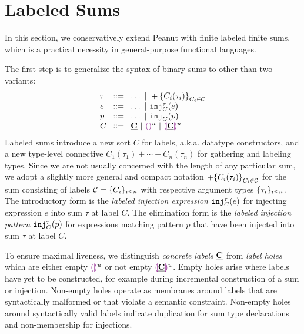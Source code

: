 \section{Labeled Sums}\label{sec:labeledsums}

In this section, we conservatively extend Peanut with finite labeled finite sums, which is a practical necessity in general-purpose functional languages.

The first step is to generalize the syntax of binary sums to other than two variants:
\[
  \arraycolsep=4pt\begin{array}{lll}
    \tau & ::= & \ldots ~\vert~ \tlabeledsum{C_i(\tau_i)}_{C_i \in \tagset} \\
    e    & ::= & \ldots ~\vert~ \hinj{C}{\tau}{e}                           \\
    p    & ::= & \ldots ~\vert~ \hinjp{C}{p}                                \\
    C    & ::= & \tagC ~\vert~ \tagehole{u} ~\vert~ \taghole{\tagC}{u}
  \end{array}
\]
Labeled sums introduce a new sort $C$ for labels, a.k.a. datatype constructors, and a new type-level connective $C_1(\tau_1) + \cdots + C_n(\tau_n)$ for gathering and labeling types.
Since we are not usually concerned with the length of any particular sum,
we adopt a slightly more general and compact notation $+\mathopen{}\left\{C_i(\tau_i)\right\}_{C_i \in \mathcal{C}}$
for the sum consisting of labels $\mathcal{C} = \{C_i\}_{i \leq n}$ with respective argument types $\{\tau_i\}_{i \leq n}$.
The introductory form is the \emph{labeled injection expression} $\mathtt{inj}_{C}^{\tau}({e})$ for injecting expression $e$ into sum $\tau$ at label $C$.
The elimination form is the \emph{labeled injection pattern} $\mathtt{inj}_{C}^{\tau}({p})$ 
for expressions matching pattern $p$ that have been injected into sum $\tau$ at label $C$.

To ensure maximal liveness, we distinguish \emph{concrete labels} $\underline{\mathbf{C}}$
from \emph{label holes} which are either empty $\textcolor{violet}{\llparenthesis}\textcolor{violet}{\rrparenthesis}^{u}$ or not empty $\textcolor{violet}{\llparenthesis}\underline{\mathbf{C}}\textcolor{violet}{\rrparenthesis}^{u}$.
Empty holes arise where labels have yet to be constructed, for example during incremental construction of a sum or injection.
Non-empty holes operate as membranes around labels that are syntactically malformed or that violate a semantic constraint.
Non-empty holes around syntactically valid labels indicate duplication for sum type declarations and non-membership for injections.

